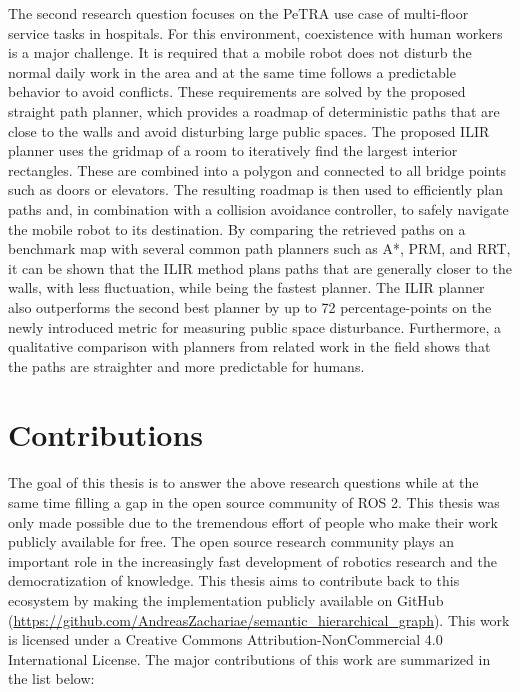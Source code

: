 The second research question focuses on the PeTRA use case of multi-floor service tasks in hospitals. For this environment, coexistence with human workers is a major challenge. It is required that a mobile robot does not disturb the normal daily work in the area and at the same time follows a predictable behavior to avoid conflicts. These requirements are solved by the proposed straight path planner, which provides a roadmap of deterministic paths that are close to the walls and avoid disturbing large public spaces. The proposed ILIR planner uses the gridmap of a room to iteratively find the largest interior rectangles. These are combined into a polygon and connected to all bridge points such as doors or elevators. The resulting roadmap is then used to efficiently plan paths and, in combination with a collision avoidance controller, to safely navigate the mobile robot to its destination. By comparing the retrieved paths on a benchmark map with several common path planners such as A*, PRM, and RRT, it can be shown that the ILIR method plans paths that are generally closer to the walls, with less fluctuation, while being the fastest planner. The ILIR planner also outperforms the second best planner by up to 72 percentage-points on the newly introduced metric for measuring public space disturbance. Furthermore, a qualitative comparison with planners from related work in the field shows that the paths are straighter and more predictable for humans.

\section{Contributions}
\label{sec:Contributions}
The goal of this thesis is to answer the above research questions while at the same time filling a gap in the open source community of ROS 2. This thesis was only made possible due to the tremendous effort of people who make their work publicly available for free. The open source research community plays an important role in the increasingly fast development of robotics research and the democratization of knowledge. This thesis aims to contribute back to this ecosystem by making the implementation publicly available on GitHub (\url{https://github.com/AndreasZachariae/semantic_hierarchical_graph}). This work is licensed under a Creative Commons Attribution-NonCommercial 4.0 International License. The major contributions of this work are summarized in the list below:

